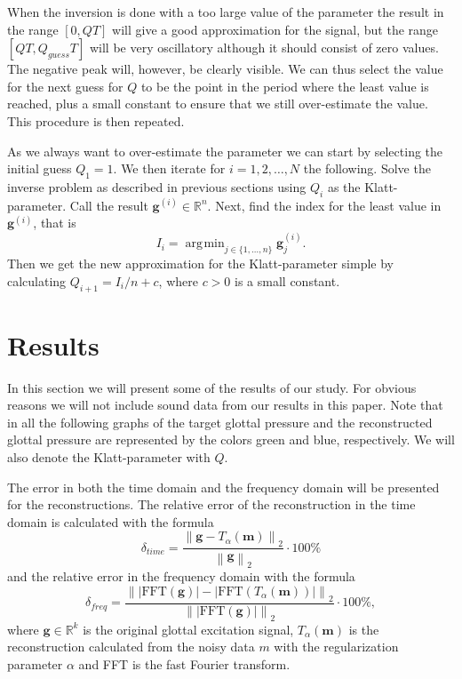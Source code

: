 \documentclass[12pt,a4]{article}
\DeclareMathOperator*{\argmin}{\arg\!\min}
\newcommand{\R}{{\mathbb R}}
\newcommand{\vc}[1]{\ensuremath{\bm{#1}}}
\begin{document}
When the inversion is done with a too large value of the parameter the result in the range $[0, QT]$ will give a good approximation for the signal, but the range $[QT, Q_{guess} T]$ will be very oscillatory although it should consist of zero values. The negative peak will, however, be clearly visible.  We can thus select the value for the next guess for $Q$ to be the point in the period where the least value is reached, plus a small constant to ensure that we still over-estimate the value. This procedure is then repeated.

As we always want to over-estimate the parameter we can start by selecting the initial guess $Q_1 = 1$. We then iterate for $i = 1, 2, \ldots, N$ the following. Solve the inverse problem as described in previous sections using $Q_i$ as the Klatt-parameter. Call the result $\vc{g}^{(i)} \in \R^n$. Next, find the index for the least value in $\vc{g}^{(i)}$, that is
\begin{equation*}
I_i = \argmin_{j \in \{1, \ldots, n\}} \vc{g}^{(i)}_j .
\end{equation*}
Then we get the new approximation for the Klatt-parameter simple by calculating $Q_{i+1} = I_i / n + c$, where $c > 0$ is a small constant.


\newpage

\section{Results}
\label{sec:results}
In this section we will present some of the results of our study. For obvious reasons we will not include sound data from our results in this paper. Note that in all the following graphs of the target glottal pressure and the reconstructed glottal pressure are represented by the colors green and blue, respectively. We will also denote the Klatt-parameter with $Q$.

The error in both the time domain and the frequency domain will be presented for the reconstructions. The relative error of the reconstruction in the time domain is calculated with the formula
\begin{equation}
\delta_{time} = \frac{\left\| \vc{g} - T_{\alpha}(\vc{m}) \right\|_2}{\left\| \vc{g} \right\|_2} \cdot 100 \%
\end{equation}
and the relative error in the frequency domain with the formula
\begin{equation}
\delta_{freq} = \frac{\left\| \left|\text{FFT}\left(\vc{g}\right)\right| - \left|\text{FFT}\left(T_{\alpha}(\vc{m})\right)\right| \right\|_2}{\left\| \left|\text{FFT}\left(\vc{g}\right)\right| \right\|_2} \cdot 100 \% ,
\end{equation}
where $\vc{g} \in \R^k$ is the original glottal excitation signal, $T_{\alpha}(\vc{m})$ is the reconstruction calculated from the noisy data $m$ with the regularization parameter $\alpha$ and FFT is the fast Fourier transform.
\end{document}
